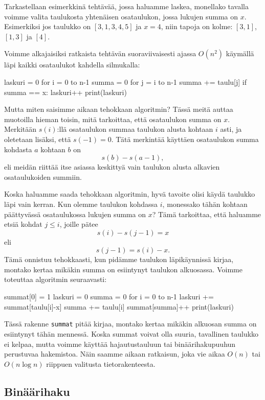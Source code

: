 Tarkastellaan esimerkkinä tehtävää, jossa haluamme laskea,
monellako tavalla voimme valita taulukosta yhtenäisen osataulukon,
jossa lukujen summa on $x$.
Esimerkiksi jos taulukko on $[3,1,3,4,5]$ ja $x=4$,
niin tapoja on kolme: $[3,1]$, $[1,3]$ ja $[4]$.

Voimme alkajaisiksi ratkaista tehtävän suoraviivaisesti ajassa $O(n^2)$
käy\-mällä läpi kaikki osataulukot kahdella silmukalla:

\begin{code}
laskuri = 0
for i = 0 to n-1
    summa = 0
    for j = i to n-1
        summa += taulu[j]
        if summa == x:
            laskuri++
print(laskuri)
\end{code}

Mutta miten saisimme aikaan tehokkaan algoritmin?
Tässä meitä auttaa muotoilla hieman toisin, mitä tarkoittaa,
että osataulukon summa on $x$.
Merkitään $s(i)$:llä osataulukon summaa taulukon alusta
kohtaan $i$ asti, ja oletetaan lisäksi, että $s(-1)=0$.
Tätä merkintää käyttäen osataulukon summa
kohdasta $a$ kohtaan $b$ on
\[s(b)-s(a-1),\]
eli meidän riittää itse asiassa keskittyä vain taulukon alusta
alkavien osataulukoiden summiin.

Koska haluamme saada tehokkaan algoritmin,
hyvä tavoite olisi käydä taulukko läpi vain kerran.
Kun olemme taulukon kohdassa $i$,
monessako tähän kohtaan päättyvässä osataulukossa
lukujen summa on $x$?
Tämä tarkoittaa, että haluamme etsiä kohdat $j \le i$,
joille pätee
\[s(i)-s(j-1)=x\]
eli
\[s(j-1)=s(i)-x.\]
Tämä onnistuu tehokkaasti, kun pidämme taulukon läpikäynnissä
kirjaa, montako kertaa mikäkin summa on esiintynyt taulukon alkuosassa.
Voimme toteuttaa algoritmin seuraavasti:

\begin{code}
summat[0] = 1
laskuri = 0
summa = 0
for i = 0 to n-1
    laskuri += summat[taulu[i]-x]
    summa += taulu[i]
    summat[summa]++
print(laskuri)
\end{code}

Tässä rakenne \texttt{summat} pitää kirjaa,
montako kertaa mikäkin alkuosan summa on esiintynyt tähän mennessä.
Koska summat voivat olla suuria, tavallinen taulukko ei kelpaa,
mutta voimme käyttää hajautustauluun tai binäärihakupuuhun
perustuvaa hakemistoa.
Näin saamme aikaan ratkaisun, joka vie aikaa $O(n)$ tai $O(n \log n)$
riippuen valitusta tietorakenteesta.

\subsection{Binäärihaku}

